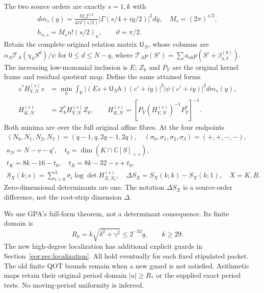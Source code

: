 \documentclass[11pt,a4paper]{article}
\newcommand{\R}{\mathbb R}
\newcommand{\C}{\mathbb C}
\begin{document}
The two source orders are exactly $s=1,k$ with
\begin{equation}
\begin{gathered}
 dm_s(y)=\frac{M_s2^{s/2}}{4\pi\Gamma(s/2)}
 |\Gamma(s/4+iy/2)|^2dy,\quad M_s=(2\pi)^{s/2},\\
 h_{n,s}=M_sn!(s/2)_n,\qquad \vartheta=\pi/2.
\end{gathered}\label{eor:eq:sources}
\end{equation}
Retain the complete original relation matrix $\mathsf U_N$, whose columns are
$\alpha_A\mathcal T_A(\chi_kS^d)/\psi$ for $0\le d\le N-q$,
where $\mathcal T_Ap(S')=\sum a_{ab}p(S'+\beta_{a,b}^{(8)})$.
The increasing low-monomial inclusion is $E$; $Z_k$ and $P_Y$ are the original
kernel frame and residual quotient map. Define the same attained forms
\begin{equation}
\begin{split}
 z^*H_{Y,N}^{(s)}z&=\min_h\int_\R
 |(Ez+\mathsf U_Nh)(c'+iy)|^2|\psi(c'+iy)|^2dm_s(y),\\
 H_{K,N}^{(s)}&=Z_k^*H_{Y,N}^{(s)}Z_k,\qquad
 H_{R,N}^{(s)}=[P_Y(H_{Y,N}^{(s)})^{-1}P_Y^*]^{-1}.
\end{split}\label{eor:eq:forms}
\end{equation}
Both minima are over the full original affine fibres. At the four endpoints
\begin{equation}
\begin{gathered}
 (N_0,N_1,N_2,N_3)=(q-1,q,2q-1,2q),\quad
 (\sigma_0,\sigma_1,\sigma_2,\sigma_3)=(+,+,-,-),\\
 a_N=N-v-q',\quad t_0=\dim(K\cap\C[S]_{<v}),\\
 t_K=8k-16-t_0,\quad t_R=8k-32-v+t_0,\\
 S_X(k;s)=\sum_{i=0}^3\sigma_i\log\det H_{X,N_i}^{(s)},
 \quad\Delta S_X=S_X(k;k)-S_X(k;1),\quad X=K,R.
\end{gathered}\label{eor:eq:returns}
\end{equation}
Zero-dimensional determinants are one. The notation $\Delta S_X$ is a source-order
difference, not the root-strip dimension $\Delta$.

We use GPA's full-form theorem, not a determinant consequence. Its finite domain is
\begin{equation}
 R_k=k\sqrt{\delta^2+\gamma^2}\le2^{-33}q,\qquad k\ge29.
 \label{eor:eq:GPA-domain}
\end{equation}
The new high-degree localization has additional explicit guards in
Section~\ref{eor:sec:localization}. All hold eventually for each fixed stipulated
packet. The old finite QOT bounds remain when a new guard is not satisfied.
Arithmetic maps retain their original period domain $|u|\ge R_*$ or the supplied
exact period tests. No moving-period uniformity is inferred.
\end{document}
